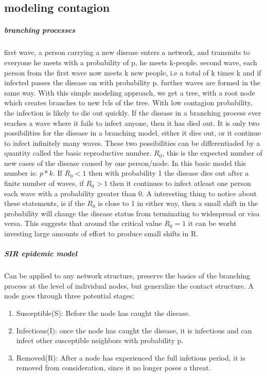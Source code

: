    \subsection{modeling contagion}
   \subparagraph{branching processes}
   first wave, a person carrying a new disease enters a network, and transmits to everyone he meets with a probability of p, he meets k-people.
second wave, each person from the first wave now meets k new people, i.e a total of k times k and if infected passes the disease on with probability p.
further waves are formed in the same way.
With this simple modeling approach, we get a tree, with a root node which creates branches to new
lvls of the tree. With low contagion probability, the infection is likely to die out quickly. 
If the disease in a branching process ever reaches a wave where it fails to infect anyone, then it has died out. It is only two possibilities for the disease in a branching model, 
either it dies out, or it continue to infect infinitely  many waves. These two possibilities can be
 differentiaded by a quantity called the basic reproductive number.  $R_{0}$, this is the expected
  number of new cases of the disease caused by one person/node. In this basic model this number is:
   $p*k$. If $R_{0}<1$ then with probability 1 the disease dies out after a finite number of waves, if $R_{0}>1$ then it continues to infect atleast one person each wave with a probability greater than 0.
   A interesting thing to notice about these statements, is if the $R_{0}$ is close to 1 in 
   either way, then a small shift in the probability will change the 
   disease status from terminating to widespread or visa versa. This suggests that around the critical value $R_{0}=1 $ it can be worht investing large amounts of effort to produce small shifts in R. 
\subparagraph{SIR epidemic model}
Can be applied to any network structure, preserve the basics of the branching process at the level of individual nodes, but generalize the contact structure. 
A node goes through three potential stages: \begin{enumerate}
\item Susceptible(S): Before the node has caught the disease.
\item Infectious(I): once the node has caught the disease, it is infectious and can infect other susceptible neighbors with probability p.
\item Removed(R): After a node has experienced the full infetious period, it is removed from consideration, since it no longer poses a threat.
\end{enumerate}
